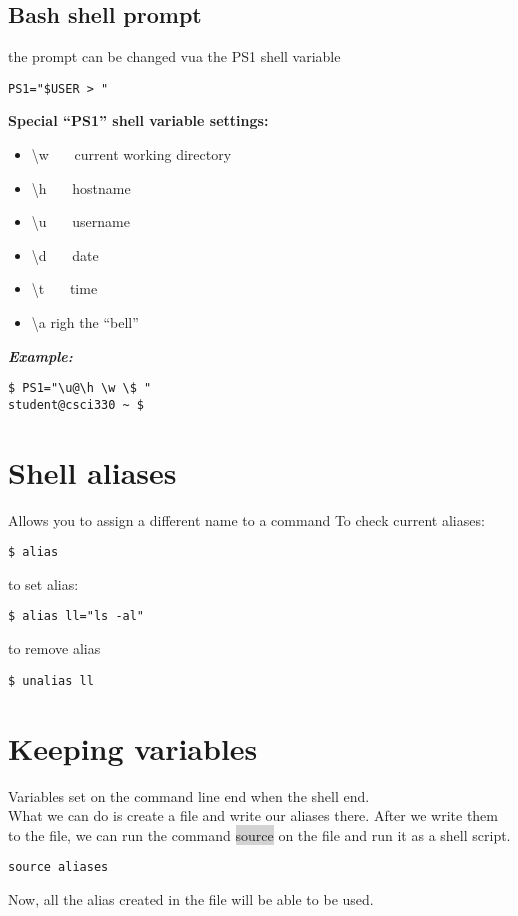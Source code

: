 \documentclass{report}
\begin{document}
\subsection{Bash shell prompt}
the prompt can be changed vua the PS1 shell variable
\begin{verbatim}
PS1="$USER > "
\end{verbatim}
\textbf{Special ``PS1'' shell variable settings:}
\begin{itemize}
  \item \textbackslash w \ \ \ current working directory
  \item \textbackslash h \ \ \ hostname
  \item \textbackslash u \ \ \ username
  \item \textbackslash d \ \ \ date
  \item \textbackslash t \ \ \ time
  \item \textbackslash a righ the ``bell''
\end{itemize}
\textit{\textbf{Example:}}
\begin{verbatim}
$ PS1="\u@\h \w \$ "
student@csci330 ~ $
\end{verbatim}
\section{Shell aliases}
Allows you to assign a different name to a command
\bigbreak \noindent
To check current aliases:
\begin{verbatim}
$ alias
\end{verbatim}
to set alias:
\begin{verbatim}
$ alias ll="ls -al"
\end{verbatim}
to remove alias
\begin{verbatim}
$ unalias ll
\end{verbatim}
\newpage
\section{Keeping variables}
Variables set on the command line end when the shell end. \\
What we can do is create a file and write our aliases there. After we write them to the file, we can run the command \colorbox{lightgray}{source} on the file and run it as a shell script.
\begin{verbatim}
source aliases
\end{verbatim}
Now, all the alias created in the file will be able to be used.
\end{document}
